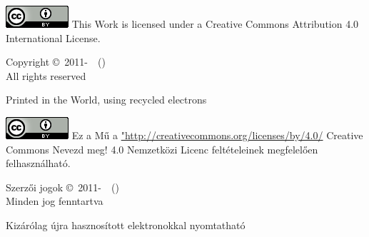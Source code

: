 \ifx\LectureLanguage\undefined
\includegraphics{../../common/images/CC88x31} 
This Work is licensed under a Creative Commons Attribution 4.0 International License.

  \textcopyright{} Copyright \copyright\ 2011-\the\year\ \LectureAuthor\ (\LectureEmail) \\
  All rights reserved


  Printed in the World, using recycled electrons

\else
  { %
\includegraphics{../../common/images/CC88x31}  Ez a Mű a \url{"http://creativecommons.org/licenses/by/4.0/} Creative Commons Nevezd meg! 4.0 Nemzetközi Licenc feltételeinek megfelelően felhasználható.
  
  \textcopyright{} Szerzői jogok \copyright\ 2011-\the\year\ \LectureAuthor\ (\LectureEmail) \\
  Minden jog fenntartva

 Kizárólag újra hasznosított elektronokkal nyomtatható

  }
\fi

